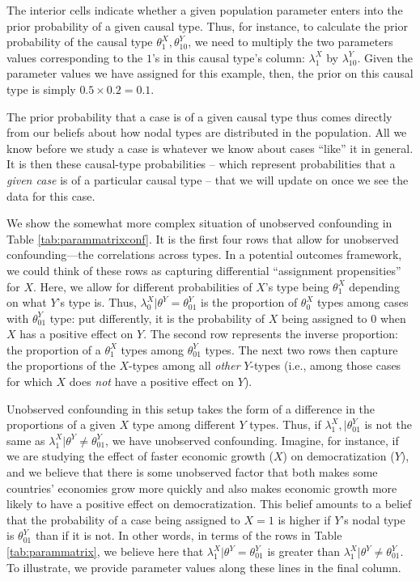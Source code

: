 \documentclass[
  12pt,
]{book}
\begin{document}
The interior cells indicate whether a given population parameter enters into the prior probability of a given causal type. Thus, for instance, to calculate the prior probability of the causal type \(\theta^X_1, \theta^Y_{10}\), we need to multiply the two parameters values corresponding to the \(1\)'s in this causal type's column: \(\lambda^X_1\) by \(\lambda^Y_{10}\). Given the parameter values we have assigned for this example, then, the prior on this causal type is simply \(0.5 \times 0.2 = 0.1\).

The prior probability that a case is of a given causal type thus comes directly from our beliefs about how nodal types are distributed in the population. All we know before we study a case is whatever we know about cases ``like'' it in general. It is then these causal-type probabilities -- which represent probabilities that a \emph{given case} is of a particular causal type -- that we will update on once we see the data for this case.

We show the somewhat more complex situation of unobserved confounding in Table \ref{tab:parammatrixconf}. It is the first four rows that allow for unobserved confounding---the correlations across types. In a potential outcomes framework, we could think of these rows as capturing differential ``assignment propensities'' for \(X\). Here, we allow for different probabilities of \(X\)'s type being \(\theta^X_1\) depending on what \(Y\)'s type is. Thus, \(\lambda^X_0 | \theta^Y= \theta^Y_{01}\) is the proportion of \(\theta^X_0\) types among cases with \(\theta^Y_{01}\) type: put differently, it is the probability of \(X\) being assigned to \(0\) when \(X\) has a positive effect on \(Y\). The second row represents the inverse proportion: the proportion of a \(\theta^X_1\) types among \(\theta^Y_{01}\) types. The next two rows then capture the proportions of the \(X\)-types among all \emph{other} \(Y\)-types (i.e., among those cases for which \(X\) does \emph{not} have a positive effect on \(Y\)).

Unobserved confounding in this setup takes the form of a difference in the proportions of a given \(X\) type among different \(Y\) types. Thus, if \(\lambda^X_1, | \theta^Y_{01}\) is not the same as \(\lambda^X_1 | \theta^Y \neq \theta^Y_{01}\), we have unobserved confounding. Imagine, for instance, if we are studying the effect of faster economic growth (\(X\)) on democratization (\(Y\)), and we believe that there is some unobserved factor that both makes some countries' economies grow more quickly and also makes economic growth more likely to have a positive effect on democratization. This belief amounts to a belief that the probability of a case being assigned to \(X=1\) is higher if \(Y\)'s nodal type is \(\theta^Y_{01}\) than if it is not. In other words, in terms of the rows in Table \ref{tab:parammatrix}, we believe here that \(\lambda^X_1 | \theta^Y=\theta^Y_{01}\) is greater than \(\lambda^X_1 | \theta^Y \neq \theta^Y_{01}\). To illustrate, we provide parameter values along these lines in the final column.
\end{document}
